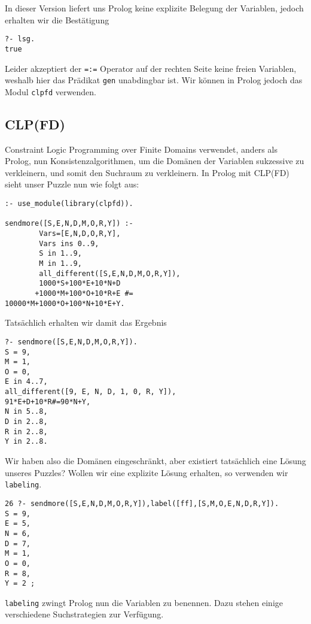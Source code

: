 In dieser Version liefert uns Prolog keine explizite Belegung der Variablen, jedoch erhalten wir die Bestätigung
\begin{verbatim}?- lsg.
true\end{verbatim}
Leider akzeptiert der \texttt{=:=} Operator auf der rechten Seite keine freien Variablen, weshalb hier das Prädikat \texttt{gen} unabdingbar ist. Wir können in Prolog jedoch das Modul
\texttt{clpfd} verwenden.
\subsection{CLP(FD)}
Constraint Logic Programming over Finite Domains verwendet, anders als Prolog, nun Konsistenzalgorithmen, um die Domänen der Variablen sukzessive zu verkleinern, und somit den Suchraum zu verkleinern.
In Prolog mit CLP(FD) sieht unser Puzzle nun wie folgt aus:

\begin{verbatim}
:- use_module(library(clpfd)).

sendmore([S,E,N,D,M,O,R,Y]) :-
        Vars=[E,N,D,O,R,Y],
        Vars ins 0..9,
        S in 1..9,
        M in 1..9,
        all_different([S,E,N,D,M,O,R,Y]),
        1000*S+100*E+10*N+D
       +1000*M+100*O+10*R+E #=
10000*M+1000*O+100*N+10*E+Y.
\end{verbatim}
Tatsächlich erhalten wir damit das Ergebnis
\begin{verbatim}
?- sendmore([S,E,N,D,M,O,R,Y]).
S = 9,
M = 1,
O = 0,
E in 4..7,
all_different([9, E, N, D, 1, 0, R, Y]),
91*E+D+10*R#=90*N+Y,
N in 5..8,
D in 2..8,
R in 2..8,
Y in 2..8.
\end{verbatim}
Wir haben also die Domänen eingeschränkt, aber existiert tatsächlich eine Lösung unseres Puzzles? Wollen wir eine explizite Lösung erhalten, so verwenden wir \texttt{labeling}.
\begin{verbatim}
26 ?- sendmore([S,E,N,D,M,O,R,Y]),label([ff],[S,M,O,E,N,D,R,Y]).
S = 9,
E = 5,
N = 6,
D = 7,
M = 1,
O = 0,
R = 8,
Y = 2 ;
\end{verbatim}

\texttt{labeling} zwingt Prolog nun die Variablen zu benennen. Dazu stehen einige verschiedene Suchstrategien zur Verfügung. \newpage

